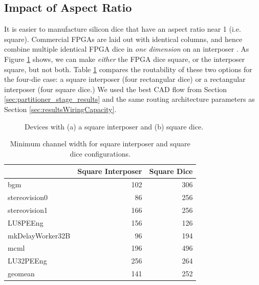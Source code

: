 \documentclass[journal]{IEEEtran}
\begin{document}
\subsection{Impact of Aspect Ratio}
\label{aspect_ratio_impact}
It is easier to manufacture silicon dice that have an aspect ratio near 1 (i.e. square). Commercial FPGAs are laid out with identical columns, and hence combine multiple identical FPGA dice in \textit{one dimension} on an interposer \cite{xilinxTSV}. As Figure \ref{fig:square_tall} shows, we can make \textit{either} the FPGA dice square, or the interposer square, but not both. Table \ref{table:squares} compares the routability of these two options for the four-die case: a square interposer (four rectangular dice) or a rectangular interposer (four square dice.) We used the best CAD flow from Section \ref{sec:partitioner_stage_results} and the same routing architecture parameters as Section \ref{sec:resultsWiringCapacity}. 

\begin{figure}[!htbp]
\centering
{}
\caption{Devices with (a) a square interposer and (b) square dice.}
\label{fig:square_tall}
\end{figure}

\begin{table}[!htbp]
\centering
\begin{tabular}{|l|r|r|}
\hline
 & Square Interposer & Square Dice \\ \hline \hline
bgm & 102 & 306 \\ \hline
stereovision0 & 86 & 256 \\ \hline
stereovision1 & 166 & 256 \\ \hline
LU8PEEng & 156 & 126 \\ \hline
mkDelayWorker32B & 96 & 194 \\ \hline
mcml & 196 & 496 \\ \hline
LU32PEEng & 256 & 264 \\ \hhline{|=|=|=|}
geomean & 141 & 252 \\ \hline
\end{tabular}
\caption{Minimum channel width for square interposer and square dice configurations.}
\label{table:squares}
\end{table}
\end{document}
